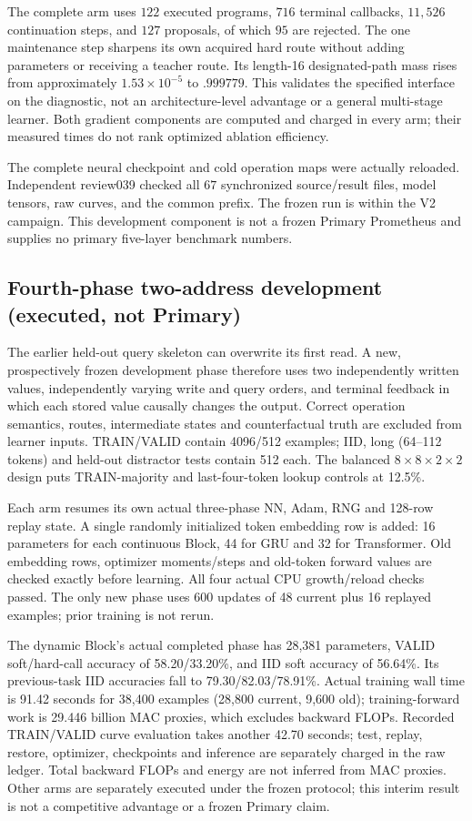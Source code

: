 The complete arm uses $122$ executed programs, $716$ terminal callbacks,
$11{,}526$ continuation steps, and $127$ proposals, of which $95$ are rejected.
The one maintenance step sharpens its own acquired hard route without adding
parameters or receiving a teacher route. Its length-16 designated-path mass
rises from approximately $1.53\times10^{-5}$ to $.999779$. This validates the
specified interface on the diagnostic, not an architecture-level advantage or
a general multi-stage learner. Both gradient components are computed and charged
in every arm; their measured times do not rank optimized ablation efficiency.

The complete neural checkpoint and cold operation maps were actually reloaded.
Independent review039 checked all $67$ synchronized source/result files,
model tensors, raw curves, and the common prefix. The frozen run is
within the V2 campaign. This development component is not a frozen Primary
Prometheus and supplies no primary five-layer benchmark numbers.


\subsection{Fourth-phase two-address development (executed, not Primary)}
The earlier held-out query skeleton can overwrite its first read. A new,
prospectively frozen development phase therefore uses two independently
written values, independently varying write and query orders, and terminal
feedback in which each stored value causally changes the output. Correct
operation semantics, routes, intermediate states and counterfactual truth
are excluded from learner inputs. TRAIN/VALID contain 4096/512 examples;
IID, long (64--112 tokens) and held-out distractor tests contain 512 each.
The balanced $8\times8\times2\times2$ design puts TRAIN-majority and
last-four-token lookup controls at 12.5\%.

Each arm resumes its own actual three-phase NN, Adam, RNG and 128-row
replay state. A single randomly initialized token embedding row is added:
16 parameters for each continuous Block, 44 for GRU and 32 for Transformer.
Old embedding rows, optimizer moments/steps and old-token forward values
are checked exactly before learning. All four actual CPU growth/reload
checks passed. The only new phase uses 600 updates of 48 current plus 16
replayed examples; prior training is not rerun.

The dynamic Block's actual completed phase has 28,381 parameters, VALID
soft/hard-call accuracy of 58.20/33.20\%, and IID soft accuracy of 56.64\%.
Its previous-task IID accuracies fall to 79.30/82.03/78.91\%. Actual training
wall time is 91.42 seconds for 38,400 examples (28,800 current, 9,600 old);
training-forward work is 29.446 billion MAC proxies, which excludes
backward FLOPs. Recorded TRAIN/VALID curve evaluation takes another
42.70 seconds; test, replay, restore, optimizer, checkpoints and inference
are separately charged in the raw ledger. Total backward FLOPs and energy
are not inferred from MAC proxies. Other arms are separately executed
under the frozen protocol; this interim result is not a competitive
advantage or a frozen Primary claim.

